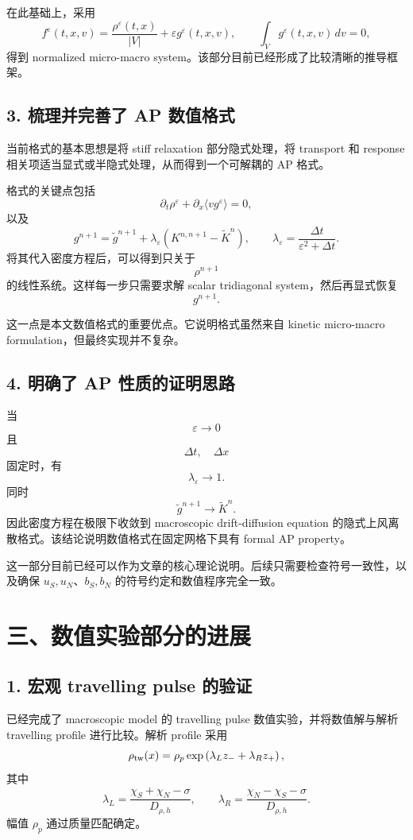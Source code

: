 \documentclass[11pt]{ctexart}
\begin{document}
在此基础上，采用
\[
f^\varepsilon(t,x,v)
=
\frac{\rho^\varepsilon(t,x)}{|V|}
+
\varepsilon g^\varepsilon(t,x,v),
\qquad
\int_V g^\varepsilon(t,x,v)\,dv=0,
\]
得到 normalized micro-macro system。该部分目前已经形成了比较清晰的推导框架。

\subsection*{3. 梳理并完善了 AP 数值格式}

当前格式的基本思想是将 stiff relaxation 部分隐式处理，将 transport 和 response 相关项适当显式或半隐式处理，从而得到一个可解耦的 AP 格式。

格式的关键点包括
\[
\partial_t \rho^\varepsilon
+
\partial_x\langle v g^\varepsilon\rangle
=0,
\]
以及
\[
g^{n+1}
=
\widetilde g^{n+1}
+
\lambda_\varepsilon
\left(
K^{n,n+1}
-
\widetilde K^n
\right),
\qquad
\lambda_\varepsilon
=
\frac{\Delta t}{\varepsilon^2+\Delta t}.
\]
将其代入密度方程后，可以得到只关于
\[
\rho^{n+1}
\]
的线性系统。这样每一步只需要求解 scalar tridiagonal system，然后再显式恢复
\[
g^{n+1}.
\]

这一点是本文数值格式的重要优点。它说明格式虽然来自 kinetic micro-macro formulation，但最终实现并不复杂。

\subsection*{4. 明确了 AP 性质的证明思路}

当
\[
\varepsilon\to0
\]
且
\[
\Delta t,\quad \Delta x
\]
固定时，有
\[
\lambda_\varepsilon\to1.
\]
同时
\[
\widetilde g^{n+1}\to \widetilde K^n.
\]
因此密度方程在极限下收敛到 macroscopic drift-diffusion equation 的隐式上风离散格式。该结论说明数值格式在固定网格下具有 formal AP property。

这一部分目前已经可以作为文章的核心理论说明。后续只需要检查符号一致性，以及确保 \(u_S,u_N\)、\(b_S,b_N\) 的符号约定和数值程序完全一致。

\section*{三、数值实验部分的进展}

\subsection*{1. 宏观 travelling pulse 的验证}

已经完成了 macroscopic model 的 travelling pulse 数值实验，并将数值解与解析 travelling profile 进行比较。解析 profile 采用
\[
\rho_{\rm tw}(x)
=
\rho_p
\exp\left(
\lambda_L z_-
+
\lambda_R z_+
\right),
\]
其中
\[
\lambda_L
=
\frac{\chi_S+\chi_N-\sigma}{D_{\rho,h}},
\qquad
\lambda_R
=
\frac{\chi_N-\chi_S-\sigma}{D_{\rho,h}}.
\]
幅值 \(\rho_p\) 通过质量匹配确定。
\end{document}
